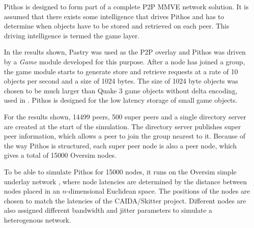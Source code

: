 Pithos is designed to form part of a complete P2P MMVE network solution. It is assumed that there exists some intelligence that drives Pithos and has
to determine when objects have to be stored and retrieved on each peer. This driving intelligence is termed the game layer.

In the results shown, Pastry was used as the P2P overlay and Pithos was driven by a \emph{Game} module developed for this purpose. After a node has
joined a group, the game module starts to generate store and retrieve requests at a rate of 10 objects per second and a size of 1024 bytes. The size
of 1024 byte objects was chosen to be much larger than Quake 3 game objects without delta encoding, used in \cite{Bharambe_Donnybrook}. Pithos is
designed for the low latency storage of small game objects.

For the results shown, 14499 peers, 500 super peers and a single directory server are created at the start of the simulation. The directory server
publishes super peer information, which allows a peer to join the group nearest to it. Because of the way Pithos is structured, each super peer node
is also a peer node, which gives a total of 15000 Oversim nodes.

To be able to simulate Pithos for 15000 nodes, it runs on the Oversim simple underlay network \cite{oversim_applications}, where node latencies are
determined by the distance between nodes placed in an $n$-dimensional Euclidean space. The positions of the nodes are chosen to match the latencies
of the CAIDA/Skitter project. Different nodes are also assigned different bandwidth and jitter parameters to simulate a heterogenous network.
